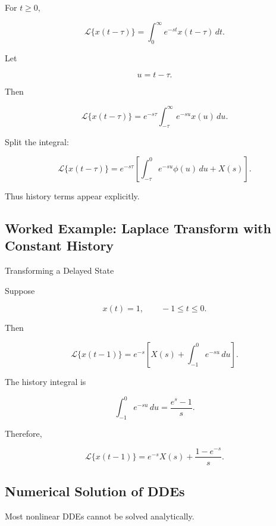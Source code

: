 For \(t\geq0\),

\[
\mathcal{L}\{x(t-\tau)\}
=
\int_0^\infty
e^{-st}x(t-\tau)\,dt.
\]

Let

\[
u=t-\tau.
\]

Then

\[
\mathcal{L}\{x(t-\tau)\}
=
e^{-s\tau}
\int_{-\tau}^{\infty}
e^{-su}x(u)\,du.
\]

Split the integral:

\[
\boxed{
\mathcal{L}\{x(t-\tau)\}
=
e^{-s\tau}
\left[
\int_{-\tau}^{0}
e^{-su}\phi(u)\,du
+
X(s)
\right].
}
\]

Thus history terms appear explicitly.

\subsection{Worked Example: Laplace Transform with Constant History}
\label{subsec:worked-laplace-dde-history}

\begin{workedexamplebox}{Transforming a Delayed State}

Suppose

\[
x(t)=1,
\qquad
-1\leq t\leq0.
\]

Then

\[
\mathcal{L}\{x(t-1)\}
=
e^{-s}
\left[
X(s)
+
\int_{-1}^{0}
e^{-su}\,du
\right].
\]

The history integral is

\[
\int_{-1}^{0}
e^{-su}\,du
=
\frac{
e^s-1
}{
s
}.
\]

Therefore,

\begin{answerbox}
\[
\boxed{
\mathcal{L}\{x(t-1)\}
=
e^{-s}X(s)
+
\frac{
1-e^{-s}
}{
s
}.
}
\]
\end{answerbox}

\end{workedexamplebox}

\subsection{Numerical Solution of DDEs}
\label{subsec:numerical-solution-ddes}

Most nonlinear DDEs cannot be solved analytically.

